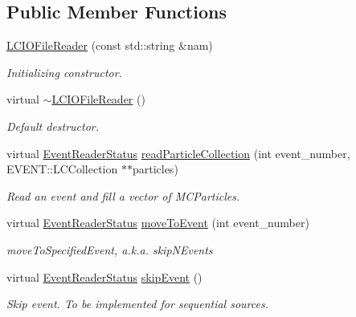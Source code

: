 \subsection*{Public Member Functions}
\begin{DoxyCompactItemize}
\item 
\hyperlink{class_d_d4hep_1_1_simulation_1_1_l_c_i_o_file_reader_a98e9bb0a70768e6cd517f7f3ab552dc6}{LCIOFileReader} (const std::string \&nam)
\begin{DoxyCompactList}\small\item\em Initializing constructor. \item\end{DoxyCompactList}\item 
virtual \hyperlink{class_d_d4hep_1_1_simulation_1_1_l_c_i_o_file_reader_aa8bf3dbda65e5c2443027f2dd94390e4}{$\sim$LCIOFileReader} ()
\begin{DoxyCompactList}\small\item\em Default destructor. \item\end{DoxyCompactList}\item 
virtual \hyperlink{class_d_d4hep_1_1_simulation_1_1_geant4_event_reader_ae4f4bc83ffcf5b0c1868ad78859851e7}{EventReaderStatus} \hyperlink{class_d_d4hep_1_1_simulation_1_1_l_c_i_o_file_reader_a4163f75ac06423136ab2c3e806713b83}{readParticleCollection} (int event\_\-number, EVENT::LCCollection $\ast$$\ast$particles)
\begin{DoxyCompactList}\small\item\em Read an event and fill a vector of MCParticles. \item\end{DoxyCompactList}\item 
virtual \hyperlink{class_d_d4hep_1_1_simulation_1_1_geant4_event_reader_ae4f4bc83ffcf5b0c1868ad78859851e7}{EventReaderStatus} \hyperlink{class_d_d4hep_1_1_simulation_1_1_l_c_i_o_file_reader_ad4648d75cd88d24476ff41e493b5c0ed}{moveToEvent} (int event\_\-number)
\begin{DoxyCompactList}\small\item\em moveToSpecifiedEvent, a.k.a. skipNEvents \item\end{DoxyCompactList}\item 
virtual \hyperlink{class_d_d4hep_1_1_simulation_1_1_geant4_event_reader_ae4f4bc83ffcf5b0c1868ad78859851e7}{EventReaderStatus} \hyperlink{class_d_d4hep_1_1_simulation_1_1_l_c_i_o_file_reader_a4b14dad308419f968982e216c11bb15a}{skipEvent} ()
\begin{DoxyCompactList}\small\item\em Skip event. To be implemented for sequential sources. \item\end{DoxyCompactList}\end{DoxyCompactItemize}
